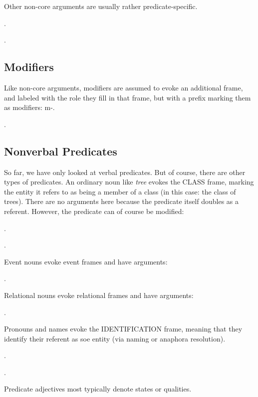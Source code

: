 \documentclass[a4paper]{article}
\newcommand{\fr}[1]{\textsf{#1}}
\newcommand{\rl}[1]{\textsf{#1}}
\begin{document}
Other non-core arguments are usually rather predicate-specific.

\ex.

\ex.

\subsection{Modifiers}

Like non-core arguments, modifiers are assumed to evoke an additional frame,
and labeled with the role they fill in that frame, but with a prefix marking
them as modifiers: \rl{m-}.

\ex.

\subsection{Nonverbal Predicates}

So far, we have only looked at verbal predicates. But of course, there are other types of predicates. An ordinary noun like \emph{tree} evokes the \fr{CLASS} frame, marking the entity it refers to as being a member of a class (in this case: the class of trees). There are no arguments here because the predicate itself doubles as a referent. However, the predicate can of course be modified:

\ex.

\ex.

Event nouns evoke event frames and have arguments:

\ex.

Relational nouns evoke relational frames and have arguments:

\ex.

Pronouns and names evoke the \fr{IDENTIFICATION} frame, meaning that they
identify their referent as soe entity (via naming or anaphora resolution).

\ex.

\ex.

Predicate adjectives most typically denote states or qualities.
\end{document}

